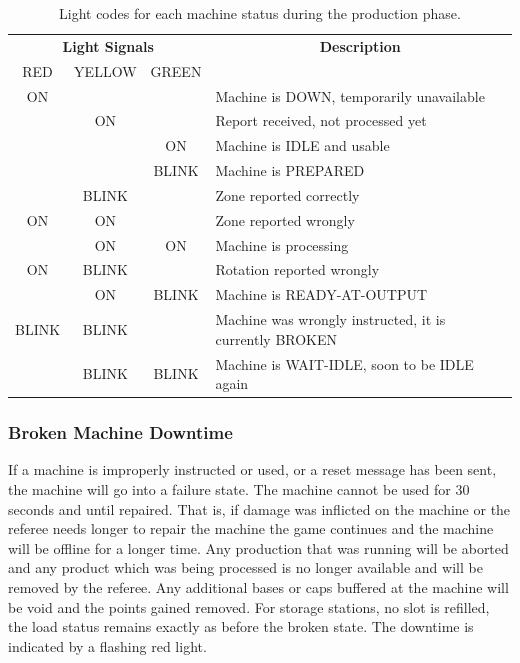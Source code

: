 \documentclass[12pt,twoside]{article}
\begin{document}
\begin{table}
  \begin{tabular}{c|c|c||l}
    \hline
    \multicolumn{3}{c||}{\bf{Light Signals}} &
    \multicolumn{1}{c}{\bf{Description}} \\\cline{1-3}
    RED & YELLOW    & GREEN & \\\hline
    ON    &       &       & Machine is DOWN, temporarily unavailable \\
          & ON    &       & Report received, not processed yet \\
          &       & ON    & Machine is IDLE and usable  \\
          &       & BLINK & Machine is PREPARED  \\
          & BLINK &       & Zone reported correctly \\
    ON    & ON    &       & Zone reported wrongly \\
          & ON    & ON    & Machine is processing \\
    ON    & BLINK &       & Rotation reported wrongly \\
          & ON    & BLINK & Machine is READY-AT-OUTPUT \\
    BLINK & BLINK &       & Machine was wrongly instructed, it is currently
    BROKEN \\
          & BLINK & BLINK & Machine is WAIT-IDLE, soon to be IDLE again \\
  \end{tabular}
  \caption{Light codes for each machine status during the production phase.}
  \label{tab:machine-lights}
\end{table}

\subsubsection{Broken Machine Downtime}
\label{sec:broken-machine}
If a machine is improperly instructed or used, or a reset message has
been sent, the machine will go into a failure state. The machine cannot be
used for 30 seconds and until repaired.
That is, if damage was
inflicted on the machine or the referee needs longer to repair the
machine the game continues and the machine will be offline for a
longer time. Any production that was running will be aborted and any
product which was being processed is no longer available and will be
removed by the referee. Any additional bases or caps buffered at the machine
will be void and the points gained removed. For storage stations, no
slot is refilled, the load status remains exactly as before the broken
state. The downtime is indicated by a flashing red light.
\end{document}
